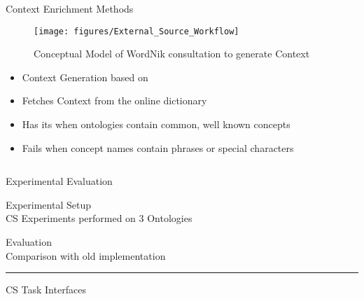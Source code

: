 \documentclass[final,hyperref={pdfpagelabels=true}]{beamer}
\newenvironment{myhline}
 {\par\setlength{\topskip}{0em}%
  \begin{list}{}{%
    \setlength{\leftmargin}{0em}%
    \setlength{\rightmargin}{3em}%
  }\item\relax}
 {\par\nopagebreak\rule{\linewidth}{0.4pt}\end{list}}
\begin{document}
\begin{frame}
\begin{columns}[t, onlytextwidth]
\begin{column}{\textwidth}
\begin{column}{\textwidth}
\begin{block}{Context Enrichment Methods}
\begin{minipage}[t]{.3\linewidth}
					\begin{figure}[H]
						 \centering
						 \texttt{[image: figures/External\_Source\_Workflow]}
						 \caption{Conceptual Model of WordNik consultation to generate Context}
					\end{figure}
					\vspace{-1cm}
					\hrulefill
					\vspace{1.5cm}
					\begin{itemize}
						\small
						\justifying
						\setlength\itemsep{1cm}
						\item Context Generation based on {\color{BeamerBlue}{Dictionary Lookup}}
						\item Fetches Context from the online dictionary {\color{BeamerBlue}{WorkNik}}
						\item Has its {\color{BeamerBlue}{strengths}} when ontologies contain common, well known concepts
						\item Fails when concept names contain phrases or special characters
					\end{itemize}
				\end{minipage}
				\hfill
			\end{block}
		\end{column}
		
		
		\begin{columns}[t, onlytextwidth]
			\begin{column}{.49\linewidth}
				\begin{block}{Experimental Evaluation}
					\begin{minipage}[t][.25\textheight][c]{\textwidth}
						\begin{minipage}[t]{.45\textwidth}
							\small
							Experimental Setup\\
							CS Experiments performed on 3 Ontologies\\
						\end{minipage}
						\begin{minipage}[t]{.45\textwidth}
							\small
							Evaluation\\
							Comparison with old implementation
						\end{minipage}
						\begin{myhline}
							\vspace{-2cm}
							\hfill
						\end{myhline}
						\begin{minipage}[t]{\textwidth}
							
							\small
							CS Task Interfaces
                    	

\end{minipage}
\end{minipage}
\end{block}
\end{column}
\end{columns}
\end{column}
\end{columns}
\end{frame}
\end{document}
